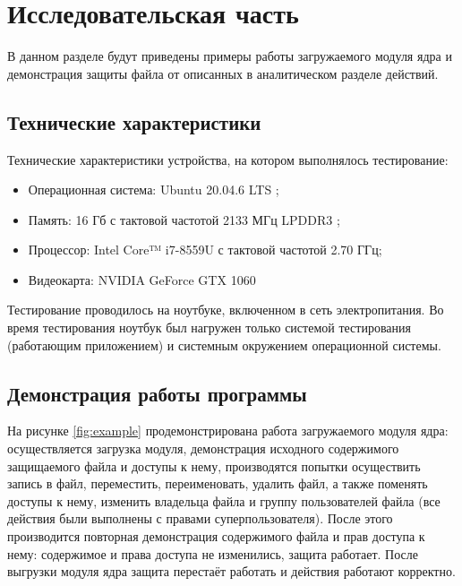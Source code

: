 \section{\large Исследовательская часть}
\label{cha:research}

В данном разделе будут приведены примеры работы загружаемого модуля ядра и демонстрация защиты файла от описанных в аналитическом разделе действий.
\subsection{Технические характеристики}

Технические характеристики устройства, на котором выполнялось тестирование:

\begin{itemize}[label=---]
	\item Операционная система: Ubuntu 20.04.6 LTS  \cite{ubuntu};
	\item Память: 16 Гб с тактовой частотой 2133 МГц LPDDR3 \cite{memory};
	\item Процессор: Intel Core™ i7-8559U \cite{intel} с тактовой частотой  2.70 ГГц;
	\item Видеокарта: NVIDIA GeForce GTX 1060 \cite{graphics}
\end{itemize}

Тестирование проводилось на ноутбуке, включенном в сеть электропитания. Во время тестирования ноутбук был нагружен только системой тестирования (работающим приложением) и системным окружением операционной системы.

\subsection{Демонстрация работы программы}

На рисунке \ref{fig:example} продемонстрирована работа загружаемого модуля ядра: осуществляется загрузка модуля, демонстрация исходного содержимого защищаемого файла и доступы к нему, производятся попытки осуществить запись в файл, переместить, переименовать, удалить файл, а также поменять доступы к нему, изменить владельца файла и группу пользователей файла (все действия были выполнены с правами суперпользователя). 
После этого производится повторная демонстрация содержимого файла и прав доступа к нему: содержимое и права доступа не изменились, защита работает.
После выгрузки модуля ядра защита перестаёт работать и действия работают корректно.

\clearpage

